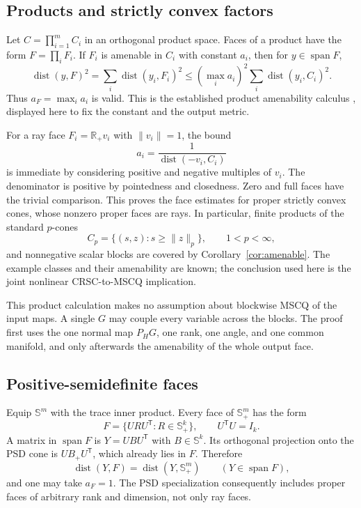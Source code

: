 \documentclass[11pt]{article}
\numberwithin{equation}{section}
\theoremstyle{definition}
\theoremstyle{remark}
\DeclareMathOperator{\dist}{dist}
\DeclareMathOperator{\spann}{span}
\newcommand{\R}{\mathbb R}
\newcommand{\Ssym}{\mathbb S}
\newcommand{\norm}[1]{\lVert #1\rVert}
\newcommand{\dset}[2]{\dist(#1,#2)}
\begin{document}
\subsection{Products and strictly convex factors}

Let $C=\prod_{i=1}^m C_i$ in an orthogonal product space. Faces of a
product have the form $F=\prod_i F_i$. If $F_i$ is amenable in $C_i$
with constant $a_i$, then for $y\in\spann F$,
\[
 \dset{y}{F}^2=\sum_i\dset{y_i}{F_i}^2
 \leq(\max_i a_i)^2\sum_i\dset{y_i}{C_i}^2.
\]
Thus $a_F=\max_i a_i$ is valid. This is the established product
amenability calculus \citep{lourencoAmenable}, displayed here to fix
the constant and the output metric.

For a ray face $F_i=\R_+v_i$ with $\norm{v_i}=1$, the bound
\[
 a_i=\frac{1}{\dset{-v_i}{C_i}}
\]
is immediate by considering positive and negative multiples of $v_i$.
The denominator is positive by pointedness and closedness. Zero and full
faces have the trivial comparison. This proves the face estimates for
proper strictly convex cones, whose nonzero proper faces are rays.
In particular, finite products of the standard $p$-cones
\[
 C_p=\{(s,z):s\geq\norm{z}_p\},\qquad 1<p<\infty,
\]
and nonnegative scalar blocks are covered by
Corollary~\ref{cor:amenable}. The example classes and their amenability
are known; the conclusion used here is the joint nonlinear CRSC-to-MSCQ
implication.

This product calculation makes no assumption about blockwise MSCQ of
the input maps. A single $G$ may couple every variable across the blocks.
The proof first uses the one normal map $P_HG$, one rank, one angle,
and one common manifold, and only afterwards the amenability of the
whole output face.

\subsection{Positive-semidefinite faces}

Equip $\Ssym^m$ with the trace inner product. Every face of $\Ssym_+^m$
has the form
\[
 F=\{URU^{\mathsf T}:R\in\Ssym_+^k\},
 \qquad U^{\mathsf T}U=I_k.
\]
A matrix in $\spann F$ is $Y=UBU^{\mathsf T}$ with $B\in\Ssym^k$.
Its orthogonal projection onto the PSD cone is
$UB_+U^{\mathsf T}$, which already lies in $F$. Therefore
\begin{equation}
 \dset{Y}{F}=\dset{Y}{\Ssym_+^m}\qquad(Y\in\spann F),
 \label{eq:psd-face}
\end{equation}
and one may take $a_F=1$. The PSD specialization consequently includes
proper faces of arbitrary rank and dimension, not only ray faces.
\end{document}
